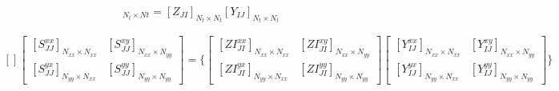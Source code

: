 \documentclass[
	12pt,				%
	openright,			%
	oneside,			%
	a4papey79r,			%
	english,			%
	brazil				%
	]{abntex2}
\begin{document}
\begin{equation}
  [S_{JJ}]_{N_t \times Nt}= [Z_{JI}]_{N_t \times N_t} [Y_{IJ}]_{N_t \times N_t}
\end{equation}

\begin{equation}
\begin{aligned}
[]

   \begin{bmatrix}[S_{JJ}^{xx}]_{N_{xx}\times N_{xx}}& [S_{JJ}^{xy}]_{N_{xx}\times N_{yy}}\\
   [S_{JJ}^{yx}]_{N_{yy}\times N_{xx}}&[S_{JJ}^{yy}]_{N_{yy}\times N_{yy}}
   \end{bmatrix} =\Biggl\{

   \begin{bmatrix}[ZI_{JI}^{xx}]_{N_{xx}\times N_{xx}}& [ZI_{JI}^{xy}]_{N_{xx}\times N_{yy}}\\
   [ZI_{JI}^{yx}]_{N_{yy}\times N_{xx}}&[ZI_{JI}^{yy}]_{N_{yy}\times N_{yy}}
   \end{bmatrix} 
  
   \begin{bmatrix}[Y_{IJ}^{xx}]_{N_{xx}\times N_{xx}}& [Y_{IJ}^{xy}]_{N_{xx}\times N_{yy}}\\
   [Y_{IJ}^{yx}]_{N_{yy}\times N_{xx}}&[Y_{IJ}^{yy}]_{N_{yy}\times N_{yy}}
   \end{bmatrix} \Biggl\}
  
 
   \end{aligned}
\end{equation}
\end{document}
